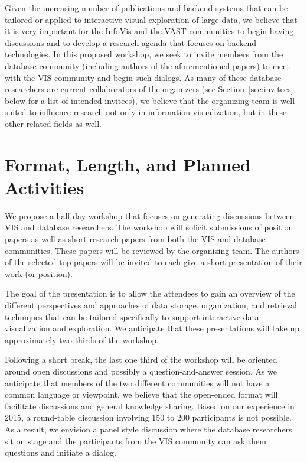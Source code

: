 \documentclass[journal]{vgtc}                %
\begin{document}
Given the increasing number of publications and backend systems that can be tailored or applied to interactive visual exploration of large data, we believe that it is very important for the InfoVis and the
VAST communities to begin having discussions and to develop a research agenda that focuses on backend technologies. 
In this proposed workshop, we seek to invite members from the database community (including authors of the aforementioned papers) to meet with the VIS community and begin such dialogs. 
As many of these database researchers are current collaborators of the organizers (see Section~\ref{sec:invitees} below for a list of intended invitees), we believe that the organizing team is well suited to influence research not only in information visualization, but in these other related fields as well.

\section{Format, Length, and Planned Activities}
We propose a half-day workshop that focuses on generating discussions between VIS and database researchers. 
The workshop will solicit submissions of position papers as well as short research papers from both the VIS and database communities. 
These papers will be reviewed by the organizing team. 
The authors of the selected top papers will be invited to each give a short presentation of their work (or position).

The goal of the presentation is to allow the attendees to gain an overview of the different perspectives and approaches of data storage, organization, and retrieval techniques that can be tailored specifically to support interactive data visualization and exploration. 
We anticipate that these presentations will take up approximately two thirds of the workshop.

Following a short break, the last one third of the workshop will be oriented around open discussions and possibly a question-and-answer session. 
As we anticipate that members of the two different communities will not have a common language or viewpoint, we believe that the open-ended format will facilitate discussions and general knowledge sharing.
Based on our experience in 2015, a round-table discussion involving 150 to 200 participants is not possible.
As a result, we envision a panel style discussion where the database researchers sit on stage and the participants from the VIS community can ask them questions and initiate a dialog.
\end{document}
